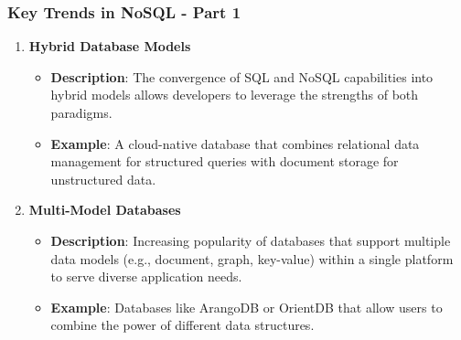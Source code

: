 \documentclass[aspectratio=169]{beamer}
\begin{document}
\begin{frame}[fragile]
    \frametitle{Key Trends in NoSQL - Part 1}
    \begin{enumerate}
        \item \textbf{Hybrid Database Models}
        \begin{itemize}
            \item \textbf{Description}: The convergence of SQL and NoSQL capabilities into hybrid models allows developers to leverage the strengths of both paradigms.
            \item \textbf{Example}: A cloud-native database that combines relational data management for structured queries with document storage for unstructured data.
        \end{itemize}
        
        \item \textbf{Multi-Model Databases}
        \begin{itemize}
            \item \textbf{Description}: Increasing popularity of databases that support multiple data models (e.g., document, graph, key-value) within a single platform to serve diverse application needs.
            \item \textbf{Example}: Databases like ArangoDB or OrientDB that allow users to combine the power of different data structures.
        \end{itemize}
    \end{enumerate}
\end{frame}
\end{document}
